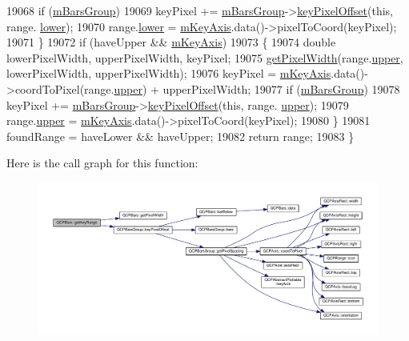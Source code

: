 \begin{DoxyCode}
19068     \textcolor{keywordflow}{if} (\hyperlink{class_q_c_p_bars_a9f59c255f3739182ca9744dff75beaa9}{mBarsGroup})
19069       keyPixel += \hyperlink{class_q_c_p_bars_a9f59c255f3739182ca9744dff75beaa9}{mBarsGroup}->\hyperlink{class_q_c_p_bars_group_a8e2ca6002e7bab49670144d048a2bcc9}{keyPixelOffset}(\textcolor{keyword}{this}, range.
      \hyperlink{class_q_c_p_range_aa3aca3edb14f7ca0c85d912647b91745}{lower});
19070     range.\hyperlink{class_q_c_p_range_aa3aca3edb14f7ca0c85d912647b91745}{lower} = \hyperlink{class_q_c_p_abstract_plottable_a426f42e254d0f8ce5436a868c61a6827}{mKeyAxis}.data()->pixelToCoord(keyPixel);
19071   \}
19072   \textcolor{keywordflow}{if} (haveUpper && \hyperlink{class_q_c_p_abstract_plottable_a426f42e254d0f8ce5436a868c61a6827}{mKeyAxis})
19073   \{
19074     \textcolor{keywordtype}{double} lowerPixelWidth, upperPixelWidth, keyPixel;
19075     \hyperlink{class_q_c_p_bars_a794eefe4fb29b9b40583654ccbf460dc}{getPixelWidth}(range.\hyperlink{class_q_c_p_range_ae44eb3aafe1d0e2ed34b499b6d2e074f}{upper}, lowerPixelWidth, upperPixelWidth);
19076     keyPixel = \hyperlink{class_q_c_p_abstract_plottable_a426f42e254d0f8ce5436a868c61a6827}{mKeyAxis}.data()->coordToPixel(range.\hyperlink{class_q_c_p_range_ae44eb3aafe1d0e2ed34b499b6d2e074f}{upper}) + upperPixelWidth;
19077     \textcolor{keywordflow}{if} (\hyperlink{class_q_c_p_bars_a9f59c255f3739182ca9744dff75beaa9}{mBarsGroup})
19078       keyPixel += \hyperlink{class_q_c_p_bars_a9f59c255f3739182ca9744dff75beaa9}{mBarsGroup}->\hyperlink{class_q_c_p_bars_group_a8e2ca6002e7bab49670144d048a2bcc9}{keyPixelOffset}(\textcolor{keyword}{this}, range.
      \hyperlink{class_q_c_p_range_ae44eb3aafe1d0e2ed34b499b6d2e074f}{upper});
19079     range.\hyperlink{class_q_c_p_range_ae44eb3aafe1d0e2ed34b499b6d2e074f}{upper} = \hyperlink{class_q_c_p_abstract_plottable_a426f42e254d0f8ce5436a868c61a6827}{mKeyAxis}.data()->pixelToCoord(keyPixel);
19080   \}
19081   foundRange = haveLower && haveUpper;
19082   \textcolor{keywordflow}{return} range;
19083 \}
\end{DoxyCode}


Here is the call graph for this function\+:\nopagebreak
\begin{figure}[H]
\begin{center}
\leavevmode
\includegraphics[width=350pt]{class_q_c_p_bars_a93cfdc8a535f36aeb087acca49c00662_cgraph}
\end{center}
\end{figure}


